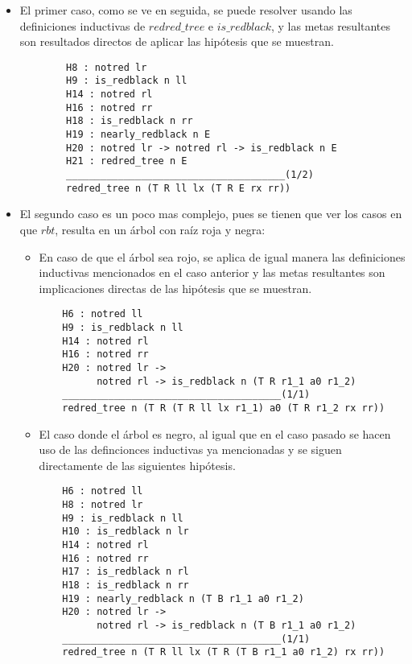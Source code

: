 \begin{itemize}
    \item El primer caso, como se ve en seguida, se puede resolver usando las definiciones
    inductivas de $redred\_tree$ e $is\_redblack$, y las metas resultantes son resultados directos
    de aplicar las hipótesis que se muestran.
    \begin{verbatim}
        H8 : notred lr
        H9 : is_redblack n ll
        H14 : notred rl
        H16 : notred rr
        H18 : is_redblack n rr
        H19 : nearly_redblack n E
        H20 : notred lr -> notred rl -> is_redblack n E
        H21 : redred_tree n E
        ______________________________________(1/2)
        redred_tree n (T R ll lx (T R E rx rr))
    \end{verbatim}
    \item El segundo caso es un poco mas complejo, pues se tienen que ver los casos en que $rbt$,
    resulta en un \'arbol con raíz roja y negra:
    \begin{itemize}
        \item En caso de que el \'arbol sea rojo, se aplica de igual manera las definiciones
        inductivas mencionados en el caso anterior y las metas resultantes son implicaciones
        directas de las hipótesis que se muestran.
    \begin{verbatim}
    H6 : notred ll
    H9 : is_redblack n ll
    H14 : notred rl
    H16 : notred rr
    H20 : notred lr ->
          notred rl -> is_redblack n (T R r1_1 a0 r1_2)
    ______________________________________(1/1)
    redred_tree n (T R (T R ll lx r1_1) a0 (T R r1_2 rx rr))
    \end{verbatim}
        \item El caso donde el \'arbol es negro, al igual que en el caso pasado se hacen uso de
        las defincionces inductivas ya mencionadas y se siguen directamente de las siguientes
        hipótesis.
    \begin{verbatim}
    H6 : notred ll
    H8 : notred lr
    H9 : is_redblack n ll
    H10 : is_redblack n lr
    H14 : notred rl
    H16 : notred rr
    H17 : is_redblack n rl
    H18 : is_redblack n rr
    H19 : nearly_redblack n (T B r1_1 a0 r1_2)
    H20 : notred lr ->
          notred rl -> is_redblack n (T B r1_1 a0 r1_2)
    ______________________________________(1/1)
    redred_tree n (T R ll lx (T R (T B r1_1 a0 r1_2) rx rr))
    \end{verbatim}
    \end{itemize}
\end{itemize}

